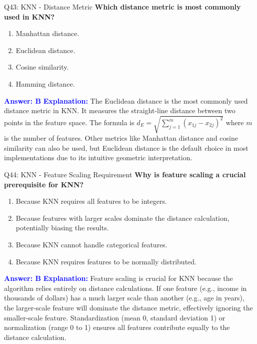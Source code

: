 \documentclass[8pt]{beamer}
\begin{document}
	\begin{frame}{Q43: KNN - Distance Metric}
		\fontsize{6.5}{7.5}\selectfont
		\textbf{Which distance metric is most commonly used in KNN?}
		\begin{enumerate}
			\item Manhattan distance.
			\item Euclidean distance.
			\item Cosine similarity.
			\item Hamming distance.
		\end{enumerate}
		\vspace{0.1cm}
		\textcolor{blue}{\textbf{Answer: B}}
		\vspace{0.1cm}
		\textcolor{blue}{\textbf{Explanation:}} The Euclidean distance is the most commonly used distance metric in KNN. It measures the straight-line distance between two points in the feature space. The formula is $d_E = \sqrt{\sum_{j=1}^m (x_{1j} - x_{2j})^2}$ where $m$ is the number of features. Other metrics like Manhattan distance and cosine similarity can also be used, but Euclidean distance is the default choice in most implementations due to its intuitive geometric interpretation.
	\end{frame}
	
	\begin{frame}{Q44: KNN - Feature Scaling Requirement}
		\fontsize{6.5}{7.5}\selectfont
		\textbf{Why is feature scaling a crucial prerequisite for KNN?}
		\begin{enumerate}
			\item Because KNN requires all features to be integers.
			\item Because features with larger scales dominate the distance calculation, potentially biasing the results.
			\item Because KNN cannot handle categorical features.
			\item Because KNN requires features to be normally distributed.
		\end{enumerate}
		\vspace{0.1cm}
		\textcolor{blue}{\textbf{Answer: B}}
		\vspace{0.1cm}
		\textcolor{blue}{\textbf{Explanation:}} Feature scaling is crucial for KNN because the algorithm relies entirely on distance calculations. If one feature (e.g., income in thousands of dollars) has a much larger scale than another (e.g., age in years), the larger-scale feature will dominate the distance metric, effectively ignoring the smaller-scale feature. Standardization (mean 0, standard deviation 1) or normalization (range 0 to 1) ensures all features contribute equally to the distance calculation.
	\end{frame}
	
\end{document}

